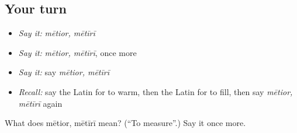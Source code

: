 \subsection*{Your turn}
\begin{itemize}
\raggedright
  \item \emph{Say it:} \emph{mētior, mētīrī}
  \item \emph{Say it:} \emph{mētior, mētīrī}, once more
  \item \emph{Say it:} say \emph{mētior, mētīrī}
  \item \emph{Recall:} say the Latin for to warm, then the Latin for to fill, then say \emph{mētior, mētīrī} again
\end{itemize}

\begin{tcolorbox}[breakable,colback=teal!4,colframe=teal!35!black,title={Before you move on}]
What does mētior, mētīrī mean? (\textquotedblleft{}To measure\textquotedblright{}.) Say it once more.
\end{tcolorbox}
